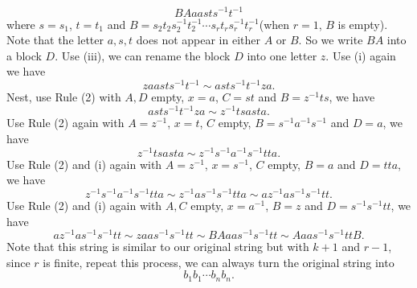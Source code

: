 \documentclass[a4paper, 12pt]{article}
\begin{document}
\begin{solution}
\begin{enumerate}[(a)]
\[BAaasts^{-1}t^{-1}\]
where \(s=s_1\), \(t=t_1\) and \(B=s_2t_2s_2^{-1}t_2^{-1}\cdots s_rt_rs_r^{-1}t_r^{-1}\)(when \(r=1\), \(B\) is empty). Note that the letter \(a,s,t\) does not appear in either \(A\) or \(B\). So we write \(BA\) into a block \(D\). 
Use (iii), we can rename the block \(D\) into one letter \(z\). Use (i) again we have 
\[zaasts^{-1}t^{-1}\sim asts^{-1}t^{-1}za.\]
Nest, use Rule (2) with \(A,D\) empty, \(x=a\), \(C=st\) and \(B=z^{-1}ts\), we have 
\[asts^{-1}t^{-1}za\sim z^{-1}tsasta.\]
Use Rule (2) again with \(A=z^{-1}\), \(x=t\), \(C\) empty, \(B=s^{-1}a^{-1}s^{-1}\) and \(D=a\), we have 
\[z^{-1}tsasta\sim z^{-1}s^{-1}a^{-1}s^{-1}tta.\]
Use Rule (2) and (i) again with \(A=z^{-1}\), \(x=s^{-1}\), \(C\) empty, \(B=a\) and \(D=tta\), we have 
\[z^{-1}s^{-1}a^{-1}s^{-1}tta\sim z^{-1}as^{-1}s^{-1}tta\sim az^{-1}as^{-1}s^{-1}tt.\]
Use Rule (2) and (i) again with \(A,C\) empty, \(x=a^{-1}\), \(B=z\) and \(D=s^{-1}s^{-1}tt\), we have 
\[az^{-1}as^{-1}s^{-1}tt\sim zaas^{-1}s^{-1}tt\sim BAaas^{-1}s^{-1}tt\sim Aaas^{-1}s^{-1}ttB.\]
Note that this string is similar to our original string but with \(k+1\) and \(r-1\), since \(r\) is finite, repeat this process, we can always turn the original string into 
\[b_1b_1\cdots b_nb_n.\]
\end{enumerate}
\end{solution}
\end{document}
